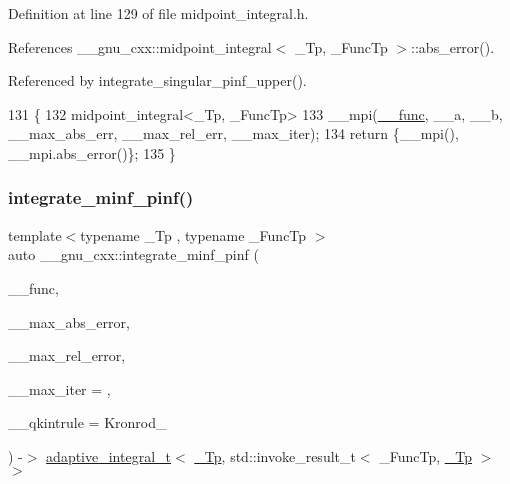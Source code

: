 Definition at line 129 of file midpoint\+\_\+integral.\+h.



References \+\_\+\+\_\+gnu\+\_\+cxx\+::midpoint\+\_\+integral$<$ \+\_\+\+Tp, \+\_\+\+Func\+Tp $>$\+::abs\+\_\+error().



Referenced by integrate\+\_\+singular\+\_\+pinf\+\_\+upper().


\begin{DoxyCode}
131     \{
132       midpoint\_integral<\_Tp, \_FuncTp>
133         \_\_mpi(\hyperlink{namespace____gnu__cxx_af2b2f0c7a2ae72b922b1afefae5a65b2}{\_\_func}, \_\_a, \_\_b, \_\_max\_abs\_err, \_\_max\_rel\_err, \_\_max\_iter);
134       \textcolor{keywordflow}{return} \{\_\_mpi(), \_\_mpi.abs\_error()\};
135     \}
\end{DoxyCode}
\mbox{\label{namespace____gnu__cxx_a4c63281e592f7319501e228c7f2e6eca}} 
\subsubsection{\texorpdfstring{integrate\+\_\+minf\+\_\+pinf()}{integrate\_minf\_pinf()}}
{\footnotesize\ttfamily template$<$typename \+\_\+\+Tp , typename \+\_\+\+Func\+Tp $>$ \\
auto \+\_\+\+\_\+gnu\+\_\+cxx\+::integrate\+\_\+minf\+\_\+pinf (\begin{DoxyParamCaption}\item[{\+\_\+\+Func\+Tp}]{\+\_\+\+\_\+func,  }\item[{\hyperlink{namespace____gnu__cxx_a3b19a9c800ca194374ef9172290f7d79}{\+\_\+\+Tp}}]{\+\_\+\+\_\+max\+\_\+abs\+\_\+error,  }\item[{\hyperlink{namespace____gnu__cxx_a3b19a9c800ca194374ef9172290f7d79}{\+\_\+\+Tp}}]{\+\_\+\+\_\+max\+\_\+rel\+\_\+error,  }\item[{std\+::size\+\_\+t}]{\+\_\+\+\_\+max\+\_\+iter = {},  }\item[{Kronrod\+\_\+\+Rule}]{\+\_\+\+\_\+qkintrule = {\ttfamily Kronrod\+\_} }\end{DoxyParamCaption}) -\/$>$  \hyperlink{struct____gnu__cxx_1_1adaptive__integral__t}{adaptive\+\_\+integral\+\_\+t}$<$ \hyperlink{namespace____gnu__cxx_a3b19a9c800ca194374ef9172290f7d79}{\+\_\+\+Tp}, std\+::invoke\+\_\+result\+\_\+t$<$ \+\_\+\+Func\+Tp, \hyperlink{namespace____gnu__cxx_a3b19a9c800ca194374ef9172290f7d79}{\+\_\+\+Tp} $>$$>$}

